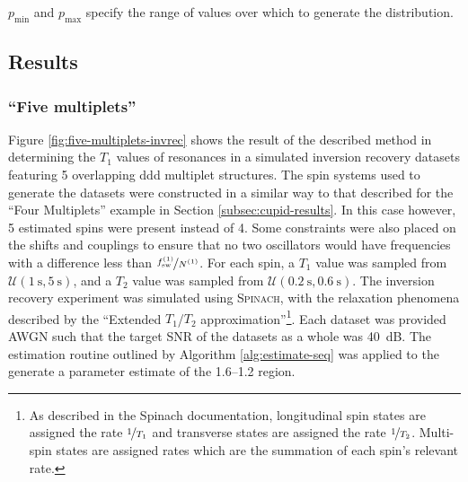 $p_{\text{min}}$ and $p_{\text{max}}$ specify the range of values over which to
generate the distribution.

\subsection{Results}

\subsubsection{``Five multiplets''}
Figure \ref{fig:five-multiplets-invrec} shows the result of the described
method in determining the $T_1$ values of resonances in a simulated inversion
recovery datasets featuring 5 overlapping ddd multiplet structures. The spin
systems used to generate the datasets were constructed in a similar way to that
described for the ``Four Multiplets'' example in
Section \ref{subsec:cupid-results}. In this case however, 5 estimated spins were
present instead of 4. Some constraints were also placed on the shifts and
couplings to ensure that no two oscillators would have frequencies with a
difference less than $\nicefrac{f_{\mathrm{sw}}^{(1)}}{N^{(1)}}$. For each spin, a $T_1$ value
was sampled from $\mathcal{U}(\qty{1}{\second}, \qty{5}{\second})$, and a $T_2$
value was sampled from  $\mathcal{U}(\qty{0.2}{\second}, \qty{0.6}{\second})$.
The inversion recovery experiment was simulated using \textsc{Spinach}, with the
relaxation phenomena described by the ``Extended $T_1$/$T_2$
approximation''\footnote{
    As described in the Spinach documentation\cite{SpinachDocs}, longitudinal
    spin states are assigned the rate $\nicefrac{1}{T_1}$ and transverse states
    are assigned the rate $\nicefrac{1}{T_2}$. Multi-spin states are assigned
    rates which are the summation of each spin's relevant rate.
}. Each dataset was provided \ac{AWGN} such that the target \ac{SNR} of the
datasets as a whole was \qty{40}{\deci\bel}.
The estimation routine outlined by Algorithm \ref{alg:estimate-seq} was applied
to the generate a parameter estimate of the
\SIrange{1.6}{1.2}{\partspermillion} region.
